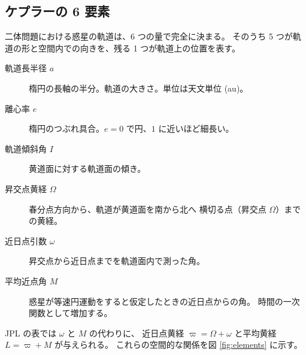 \documentclass[a4paper,11pt]{ltjsarticle}
\begin{document}
\subsection{ケプラーの 6 要素}

二体問題における惑星の軌道は、6 つの量で完全に決まる。
そのうち 5 つが軌道の形と空間内での向きを、残る 1 つが軌道上の位置を表す。

\begin{description}
  \item[軌道長半径 $a$] 楕円の長軸の半分。軌道の大きさ。単位は天文単位 (au)。
  \item[離心率 $e$] 楕円のつぶれ具合。$e=0$ で円、$1$ に近いほど細長い。
  \item[軌道傾斜角 $I$] 黄道面に対する軌道面の傾き。
  \item[昇交点黄経 $\Omega$] 春分点方向から、軌道が黄道面を南から北へ
        横切る点（昇交点 \ensuremath{\Omega}）までの黄経。
  \item[近日点引数 $\omega$] 昇交点から近日点までを軌道面内で測った角。
  \item[平均近点角 $M$] 惑星が等速円運動をすると仮定したときの近日点からの角。
        時間の一次関数として増加する。
\end{description}

JPL の表では $\omega$ と $M$ の代わりに、
近日点黄経 $\varpi = \Omega + \omega$ と平均黄経 $L = \varpi + M$ が与えられる。
これらの空間的な関係を図 \ref{fig:elements} に示す。
\end{document}

